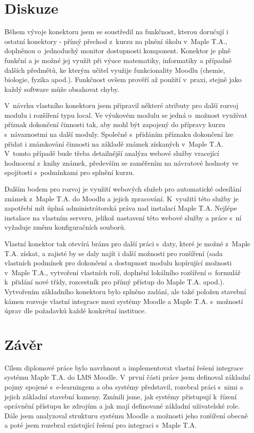 \documentclass[
print,
  11pt,
  table,   
  nolof,    
  nolot,
  oneside,
  draft
]{fithesis3}
\begin{document}
\chapter{Diskuze}
Během vývoje konektoru jsem se soustředil na funkčnost, kterou doručují i ostatní konektory - přímý přechod z~kurzu na plnění úkolu v~Maple T.A., doplněnou o~jednoduchý monitor dostupnosti komponent. Konektor je plně funkční a je možné jej využít při výuce matematiky, informatiky a případně dalších předmětů, ke kterým učitel využije funkcionality Moodlu (chemie, biologie, fyzika apod.). Funkčnost ovšem prověří až použití v~praxi, stejně jako každý software může obsahovat chyby.

V~návrhu vlastního konektoru jsem připravil některé atributy pro další rozvoj modulu i rozšíření typu local. Ve výukovém modulu se jedná o~možnost využívat příznak dokončení činnosti tak, aby mohl být zapojený do přípravy kurzu s~návaznostmi na další moduly. Společně s~přidáním příznaku dokončení lze přidat i známkování činnosti na základě známek získaných v~Maple T.A. V~tomto případě bude třeba detailnější analýza webové služby vracející hodnocení z~knihy známek, především se zaměřením na návratové hodnoty ve spojitosti s~podmínkami pro splnění kurzu.

Dalším bodem pro rozvoj je využití webových služeb pro automatické odesílání známek z~Maple T.A. do Moodlu a jejich zpracování. K~využití této služby je zapotřebí mít úplná administrátorská práva nad instalací Maple T.A. Nejlépe instalace na vlastním serveru, jelikož nastavení této webové služby a práce s~ní vyžaduje změnu konfiguračních souborů.

Vlastní konektor tak otevírá bránu pro další práci s~daty, které je možné z~Maple T.A. získat, a zajisté by se daly najít i další možnosti pro rozšíření (sada vlastních podmínek pro dokončení a dostupnost modulu kopírující možnosti v~Maple T.A., vytvoření vlastních rolí, doplnění lokálního rozšíření o~formulář k~přidání nové třídy, rozcestník pro přímý přístup do Maple T.A. apod.). Vytvořením základního konektoru bylo splněno zadání, ale také položen stavební kámen rozvoje vlastní integrace mezi systémy Moodle a Maple T.A. s~možností úprav dle požadavků každé konkrétní instituce.

\chapter{Závěr}
Cílem diplomové práce bylo navrhnout a implementovat vlastní řešení integrace systému Maple T.A. do LMS Moodle. V~první části práce jsem definoval základní pojmy spojené s~e-learningem a oba systémy představil, rozebral práci s~nimi a jejich základní stavební kameny. Zmínili jsme, jak systémy přistupují k~řízení oprávnění přístupu ke zdrojům a jak mají definované základní uživatelské role. Dále jsem analyzoval strukturu systému Moodle a možnosti jeho rozšíření obecně a poté jsem rozebral existující řešení pro integraci s~Maple T.A. 
\end{document}
